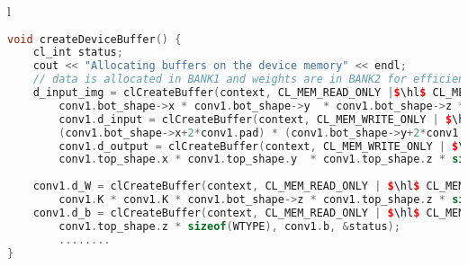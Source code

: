 \newcommand{\Hilight}{\makebox[0pt][l]{\color{highlight_yellow}\rule[-4pt]{0.78\linewidth}{14pt}}}
\newcommand{\hl}{\makebox[0pt][l]{\color{highlight_red}\rule[-4pt]{0.18\linewidth}{12pt}}}
\newcommand{\hlg}{\makebox[0pt][l]{\color{highlight_green}\rule[-4pt]{0.3\linewidth}{12pt}}}

\lstset{framesep=-5pt, xleftmargin=-5pt}
\begin{table}[!h]
\centering
\caption{Removal of Altera device-specific Macros}
\label{cnncode1:altera-dep-removal}
\begin{tabular}{l}
\toprule
\begin{lstlisting}[columns=fullflexible, language=C++, escapechar=\$]
void createDeviceBuffer() {
	cl_int status;
	cout << "Allocating buffers on the device memory" << endl;
	// data is allocated in BANK1 and weights are in BANK2 for efficient access.
	d_input_img = clCreateBuffer(context, CL_MEM_READ_ONLY |$\hl$ CL_MEM_BANK_1_ALTERA, 
		conv1.bot_shape->x * conv1.bot_shape->y  * conv1.bot_shape->z * sizeof(DTYPE), NULL, &status);
        conv1.d_input = clCreateBuffer(context, CL_MEM_WRITE_ONLY | $\hl$ CL_MEM_BANK_1_ALTERA,
		(conv1.bot_shape->x+2*conv1.pad) * (conv1.bot_shape->y+2*conv1.pad) * conv1.bot_shape->z * sizeof(DTYPE), NULL, &status);
        conv1.d_output = clCreateBuffer(context, CL_MEM_WRITE_ONLY | $\hl$ CL_MEM_BANK_1_ALTERA, 
		conv1.top_shape.x * conv1.top_shape.y  * conv1.top_shape.z * sizeof(DTYPE), NULL, &status);
	
	conv1.d_W = clCreateBuffer(context, CL_MEM_READ_ONLY | $\hl$ CL_MEM_BANK_2_ALTERA | CL_MEM_COPY_HOST_PTR, 
		conv1.K * conv1.K * conv1.bot_shape->z * conv1.top_shape.z * sizeof(WTYPE), conv1.W, &status);
	conv1.d_b = clCreateBuffer(context, CL_MEM_READ_ONLY | $\hl$ CL_MEM_BANK_2_ALTERA | CL_MEM_COPY_HOST_PTR, 
		conv1.top_shape.z * sizeof(WTYPE), conv1.b, &status);
        ........
}
\end{lstlisting}
\\
\bottomrule
\end{tabular}
\end{table}

